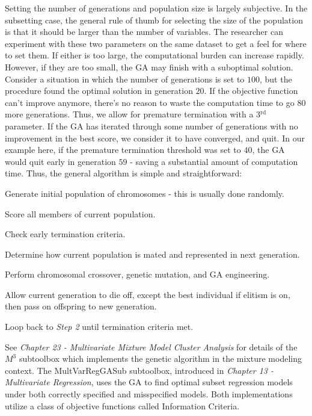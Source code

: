 \documentclass{book}
\begin{document}
Setting the number of generations and population size is largely subjective.
In the subsetting case, the general rule of thumb for selecting the size of
the population is that it should be larger than the number of variables. The
researcher can experiment with these two parameters on the same dataset to
get a feel for where to set them. If either is too large, the computational
burden can increase rapidly. However, if they are too small, the GA may
finish with a suboptimal solution. Consider a situation in which the number
of generations is set to $100$, but the procedure found the optimal solution
in generation $20$. If the objective function can't improve anymore, there's
no reason to waste the computation time to go $80$ more generations. Thus,
we allow for premature termination with a 3$^{\text{rd}}$ parameter. If the
GA has iterated through some number of generations with no improvement in
the best score, we consider it to have converged, and quit. In our example
here, if the premature termination threshold was set to $40$, the GA would
quit early in generation $59$ - saving a substantial amount of computation
time. Thus, the general algorithm is simple and straightforward:

\begin{compactenum}
\item Generate initial population of chromosomes - this is usually done randomly.

\item Score all members of current population.

\item Check early termination criteria.

\item Determine how current population is mated and represented in next generation.

\item Perform chromosomal crossover, genetic mutation, and GA engineering.

\item Allow current generation to die off, except the best individual if elitism is on, then pass on offspring to new generation.

\item Loop back to \emph{Step 2} until termination criteria met.
\end{compactenum}

See \emph{Chapter 23 - Multivariate Mixture Model Cluster Analysis} for
details of the $M^{3}$ subtoolbox which implements the genetic algorithm in
the mixture modeling context. The MultVarRegGASub subtoolbox, introduced in
\emph{Chapter 13 - Multivariate Regression}, uses the GA to find optimal
subset regression models under both correctly specified and misspecified
models. Both implementations utilize a class of objective functions called
Information Criteria.
\end{document}
